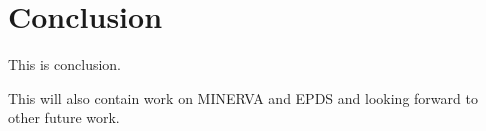 \chapter{Conclusion}

This is conclusion.

This will also contain work on MINERVA and EPDS and looking forward to
other future work.
